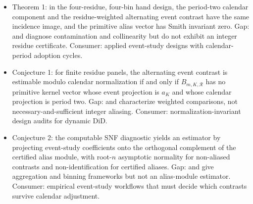 \documentclass[11pt]{article}
\newcommand{\calR}{\mathcal{R}}
\theoremstyle{definition}
\theoremstyle{plain}
\theoremstyle{remark}
\begin{document}
\begin{itemize}[leftmargin=*]
\item Theorem 1: in the four-residue, four-bin hand design, the period-two calendar component and the residue-weighted alternating event contrast have the same incidence image, and the primitive alias vector has Smith invariant zero. Gap: \citet{SunAbraham2021EventStudies} and \citet{BorusyakJaravelSpiess2024Revisiting} diagnose contamination and collinearity but do not exhibit an integer residue certificate. Consumer: applied event-study designs with calendar-period adoption cycles.
\item Conjecture 1: for finite residue panels, the alternating event contrast is estimable modulo calendar normalization if and only if $B_{m,K,\calR}$ has no primitive kernel vector whose event projection is $a_K$ and whose calendar projection is period two. Gap: \citet{GoodmanBacon2021Timing} and \citet{DeChaisemartinDHaultfoeuille2020TWFE} characterize weighted comparisons, not necessary-and-sufficient integer aliasing. Consumer: normalization-invariant design audits for dynamic DiD.
\item Conjecture 2: the computable SNF diagnostic yields an estimator by projecting event-study coefficients onto the orthogonal complement of the certified alias module, with root-$n$ asymptotic normality for non-aliased contrasts and non-identification for certified aliases. Gap: \citet{CallawaySantAnna2021MultiplePeriods} and \citet{SchmidheinySiegloch2023EventStudies} give aggregation and binning frameworks but not an alias-module estimator. Consumer: empirical event-study workflows that must decide which contrasts survive calendar adjustment.
\end{itemize}
\end{document}
